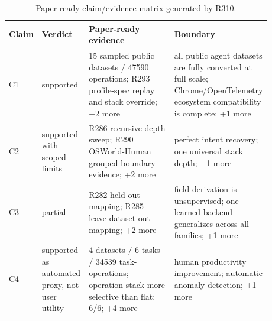 \begin{table}[t]
  \centering
  \scriptsize
  \caption{Paper-ready claim/evidence matrix generated by R310.}
  \label{tab:r310-evidence-matrix}
  \begin{tabular}{p{0.08\linewidth}p{0.16\linewidth}p{0.36\linewidth}p{0.28\linewidth}}
    \toprule
    Claim & Verdict & Paper-ready evidence & Boundary \\
    \midrule
    C1 & supported & 15 sampled public datasets / 47590 operations; R293 profile-spec replay and stack override; +2 more & all public agent datasets are fully converted at full scale; Chrome/OpenTelemetry ecosystem compatibility is complete; +1 more \\
    C2 & supported with scoped limits & R286 recursive depth sweep; R290 OSWorld-Human grouped boundary evidence; +2 more & perfect intent recovery; one universal stack depth; +1 more \\
    C3 & partial & R282 held-out mapping; R285 leave-dataset-out mapping; +2 more & field derivation is unsupervised; one learned backend generalizes across all families; +1 more \\
    C4 & supported as automated proxy, not user utility & 4 datasets / 6 tasks / 34539 task-operations; operation-stack more selective than flat: 6/6; +4 more & human productivity improvement; automatic anomaly detection; +1 more \\
    \bottomrule
  \end{tabular}
\end{table}
